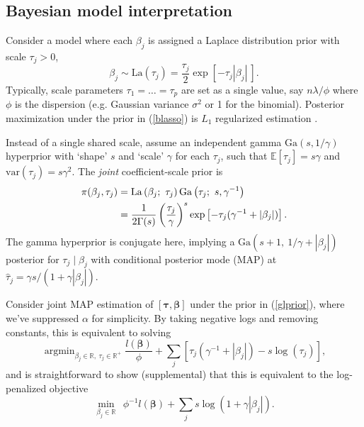 \documentclass[twoside]{article}
\DeclareMathOperator*{\argmin}{argmin}
\newcommand{\bs}[1]{\boldsymbol{#1}}
\newcommand{\mr}[1]{\mathrm{#1}}
\newcommand{\ds}[1]{\mathds{#1}}
\begin{document}
\subsection{Bayesian model interpretation}

Consider a model where each $\beta_j$ is
assigned a Laplace distribution prior with scale $\tau_j>0$,
\begin{equation}\label{blasso}
\beta_j \sim \mr{La}\left(\tau_j\right) =
\frac{\tau_j}{2}\exp\left[ -\tau_j|\beta_j| ~\right].
\end{equation}
Typically, scale parameters $\tau_1 =
\ldots = \tau_p$ are set as a single value, say $n\lambda/\phi$ where
 $\phi$ is the dispersion (e.g. Gaussian variance
$\sigma^2$ or 1 for the binomial).   Posterior
maximization under the prior in (\ref{blasso}) is $L_1$ regularized estimation \citep[e.g.,][]{park_bayesian_2008}.

Instead of a single shared scale, assume an independent gamma
$\mr{Ga}(s,1/\gamma)$ hyperprior with `shape' $s$ and `scale' $\gamma$ for
each $\tau_j$, such that $\ds{E}[\tau_j] = s\gamma$ and $\mr{var}(\tau_j) =
s\gamma^2$.  The {\it joint} coefficient-scale prior is
\begin{align}\label{glprior}
\pi(\beta_j,\tau_j) &= \mr{La}\left(\beta_j ;~ \tau_j\right)
\mr{Ga}\left(\tau_j;~ s,\gamma^{-1}\right) \\&= \frac{ 1}{2\Gamma({s})} 
\left(\frac{\tau_j}{\gamma}\right)^{s}
               \exp\left[-\tau_j(\gamma^{-1}+|\beta_j|)\right].\notag
\end{align}
The gamma hyperprior is conjugate here, implying a $\mr{Ga}\left(s+1, ~1/\gamma +
|\beta_j|\right)$ posterior for $\tau_j \mid \beta_j$ with conditional
posterior mode (MAP) at $\hat\tau_j = \gamma s/(1 + \gamma |\beta_j|)$.

Consider joint MAP estimation of $[\bs{\tau},\bs{\beta}]$ under the prior in
   (\ref{glprior}), where we've suppressed $\alpha$ for simplicity. By taking
   negative logs and removing constants, this is equivalent to solving
\begin{equation}\label{gljoint}
\argmin_{\beta_j\in\ds{R},~\tau_j \in \ds{R}^{+}}\!\!
\frac{l(\bs{\beta})}{\phi} + \sum_j \left[\tau_j(\gamma^{-1}+|\beta_j|) - s\log(\tau_j)\right],
\end{equation}
and is straightforward to show (supplemental) that this is equivalent 
to the log-penalized objective 
\begin{equation}\label{logobj}
\min_{\beta_j\in\ds{R}}~~
\phi^{-1}l(\bs{\beta}) + \sum_j  s\log(1+\gamma|\beta_j|).
\end{equation}
\end{document}
